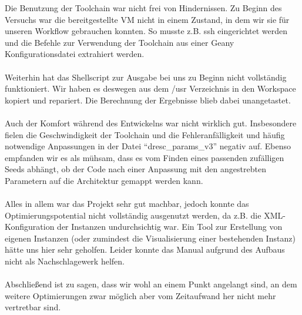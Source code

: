 \documentclass[oneside,11pt,accentcolor=tud2b, nochapname]{tudexercise}
\begin{document}
Die Benutzung der Toolchain war nicht frei von Hindernissen.
Zu Beginn des Versuchs war die bereitgestellte VM nicht in einem Zustand, in dem wir sie für unseren Workflow gebrauchen konnten.
So musste z.B. ssh eingerichtet werden und die Befehle zur Verwendung der Toolchain aus einer Geany Konfigurationsdatei extrahiert werden.\\
\\
Weiterhin hat das Shellscript zur Ausgabe bei uns zu Beginn nicht vollständig funktioniert. 
Wir haben es deswegen aus dem /usr Verzeichnis in den Workspace kopiert und repariert.
Die Berechnung der Ergebnisse blieb dabei unangetastet.\\
\\
Auch der Komfort während des Entwickelns war nicht wirklich gut.
Insbesondere fielen die Geschwindigkeit der Toolchain und die Fehleranfälligkeit und häufig notwendige Anpassungen in der Datei "`dresc\_params\_v3"' negativ auf.
Ebenso empfanden wir es als mühsam, dass es vom Finden eines passenden zufälligen Seeds abhängt, ob der Code nach einer Anpassung mit den angestrebten Parametern auf die Architektur gemappt werden kann.\\
\\
Alles in allem war das Projekt sehr gut machbar, jedoch konnte das Optimierungspotential nicht vollständig ausgenutzt werden, da z.B. die XML-Konfiguration der Instanzen undurchsichtig war.
Ein Tool zur Erstellung von eigenen Instanzen (oder zumindest die Visualisierung einer bestehenden Instanz) hätte uns hier sehr geholfen.
Leider konnte das Manual aufgrund des Aufbaus nicht als Nachschlagewerk helfen.\\
\\
Abschließend ist zu sagen, dass wir wohl an einem Punkt angelangt sind, an dem weitere Optimierungen zwar möglich aber vom Zeitaufwand her nicht mehr vertretbar sind.

\end{document}
